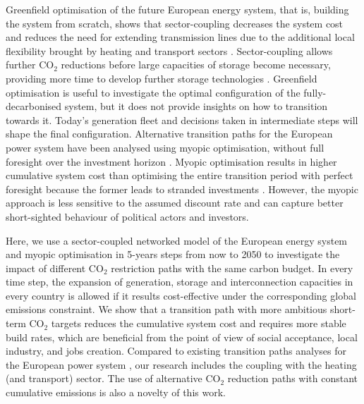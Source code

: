 \documentclass[5p]{elsarticle} %
\begin{document}
Greenfield optimisation of the future European energy system, that is, building the system from scratch, shows that sector-coupling decreases the system cost and reduces the need for extending transmission lines due to the additional local flexibility brought by heating and transport sectors \cite{Brown_2018}. Sector-coupling allows further CO$_2$ reductions before large capacities of storage become necessary, providing more time to develop further storage technologies \cite{Victoria_2019_storage}. Greenfield optimisation is useful to investigate the optimal configuration of the fully-decarbonised system, but it does not provide insights on how to transition towards it. Today's generation fleet and decisions taken in intermediate steps will shape the final configuration. 
Alternative transition paths for the European power system have been analysed using myopic optimisation, without full foresight over the investment horizon \cite{Bogdanov_2019, Plesmann_2017, Gerbaulet_2019, Poncelet_2016}. Myopic optimisation results in higher cumulative system cost than optimising the entire transition period with perfect foresight because the former leads to stranded investments \cite{Gerbaulet_2019, Heuberger_2018}. However, the myopic approach is less sensitive to the assumed discount rate and can capture better short-sighted behaviour of political actors and investors. 

Here, we use a sector-coupled networked model of the European energy system and myopic optimisation in 5-years steps from now to 2050 to investigate the impact of different CO$_2$ restriction paths with the same carbon budget. In every time step, the expansion of generation, storage and interconnection capacities in every country is allowed  if it results cost-effective under the corresponding global emissions constraint. We show that a transition path with more ambitious short-term CO$_2$ targets reduces the cumulative system cost and requires more stable build rates, which are beneficial from the point of view of social acceptance, local industry, and jobs creation. Compared to existing transition paths analyses for the European power system \cite{Plesmann_2017, Gerbaulet_2019, Poncelet_2016}, our research includes the coupling with the heating \textcolor[rgb]{1,0,0}{(and transport)} sector. The use of alternative CO$_2$ reduction paths with constant cumulative emissions is also a novelty of this work. 
\end{document}

